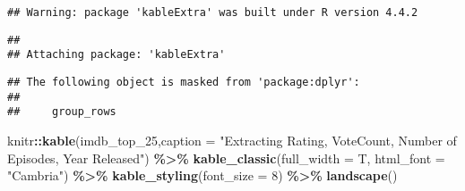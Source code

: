 \documentclass[
]{article}
\newenvironment{Shaded}{\begin{snugshade}}{\end{snugshade}}
\newcommand{\AttributeTok}[1]{\textcolor[rgb]{0.13,0.29,0.53}{#1}}
\newcommand{\DecValTok}[1]{\textcolor[rgb]{0.00,0.00,0.81}{#1}}
\newcommand{\FunctionTok}[1]{\textcolor[rgb]{0.13,0.29,0.53}{\textbf{#1}}}
\newcommand{\NormalTok}[1]{#1}
\newcommand{\SpecialCharTok}[1]{\textcolor[rgb]{0.81,0.36,0.00}{\textbf{#1}}}
\newcommand{\StringTok}[1]{\textcolor[rgb]{0.31,0.60,0.02}{#1}}
\begin{document}
\begin{verbatim}
## Warning: package 'kableExtra' was built under R version 4.4.2
\end{verbatim}

\begin{verbatim}
## 
## Attaching package: 'kableExtra'
\end{verbatim}

\begin{verbatim}
## The following object is masked from 'package:dplyr':
## 
##     group_rows
\end{verbatim}

\begin{Shaded}
\begin{Highlighting}[]
\NormalTok{knitr}\SpecialCharTok{::}\FunctionTok{kable}\NormalTok{(imdb\_top\_25,}\AttributeTok{caption =} \StringTok{"Extracting Rating, VoteCount, Number of Episodes, Year Released"}\NormalTok{) }\SpecialCharTok{\%\textgreater{}\%}
  \FunctionTok{kable\_classic}\NormalTok{(}\AttributeTok{full\_width =}\NormalTok{ T, }\AttributeTok{html\_font =} \StringTok{"Cambria"}\NormalTok{) }\SpecialCharTok{\%\textgreater{}\%}
  \FunctionTok{kable\_styling}\NormalTok{(}\AttributeTok{font\_size =} \DecValTok{8}\NormalTok{) }\SpecialCharTok{\%\textgreater{}\%}
  \FunctionTok{landscape}\NormalTok{()}
\end{Highlighting}
\end{Shaded}
\end{document}
